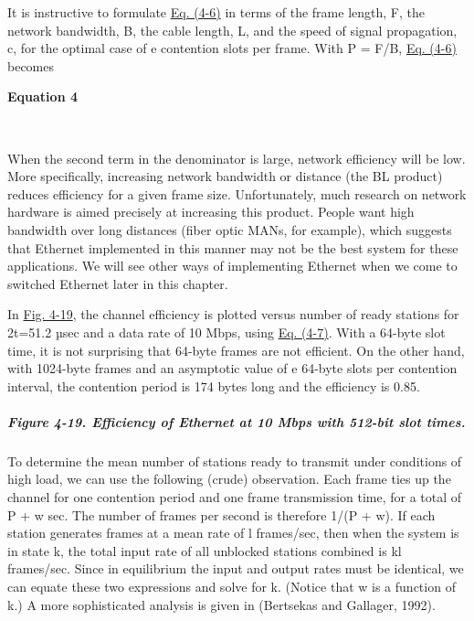 It is instructive to formulate
\protect\hyperlink{0130661023_ch04lev1sec3.htmlux5cux23ch04eq06}{Eq.
(4-6)} in terms of the frame length, {F}, the network bandwidth, {B},
the cable length, {L}, and the speed of signal propagation, {c}, for the
optimal case of {e} contention slots per frame. With {P} = {F/B},
\protect\hyperlink{0130661023_ch04lev1sec3.htmlux5cux23ch04eq06}{Eq.
(4-6)} becomes

\textbf{\protect\hypertarget{0130661023_ch04lev1sec3.htmlux5cux23ch04eq07}{}{}
Equation 4}


~

When the second term in the denominator is large, network efficiency
will be low. More specifically, increasing network bandwidth or distance
(the {BL} product) reduces efficiency for a given frame size.
Unfortunately, much research on network hardware is aimed precisely at
increasing this product. People want high bandwidth over long distances
(fiber optic MANs, for example), which suggests that Ethernet
implemented in this manner may not be the best system for these
applications. We will see other ways of implementing Ethernet when we
come to switched Ethernet later in this chapter.

In
\protect\hyperlink{0130661023_ch04lev1sec3.htmlux5cux23ch04fig19}{Fig.
4-19}, the channel efficiency is plotted versus number of ready stations
for 2{t}=51.2 µsec and a data rate of 10 Mbps, using
\protect\hyperlink{0130661023_ch04lev1sec3.htmlux5cux23ch04eq07}{Eq.
(4-7)}. With a 64-byte slot time, it is not surprising that 64-byte
frames are not efficient. On the other hand, with 1024-byte frames and
an asymptotic value of {e} 64-byte slots per contention interval, the
contention period is 174 bytes long and the efficiency is 0.85.

\subparagraph[Figure 4-19. Efficiency of Ethernet at 10 Mbps with
512-bit slot
times.]{\texorpdfstring{\protect\hypertarget{0130661023_ch04lev1sec3.htmlux5cux23ch04fig19}{}{}Figure
4-19. Efficiency of Ethernet at 10 Mbps with 512-bit slot
times.}{Figure 4-19. Efficiency of Ethernet at 10 Mbps with 512-bit slot times.}}


To determine the mean number of stations ready to transmit under
conditions of high load, we can use the following (crude) observation.
Each frame ties up the channel for one contention period and one frame
transmission time, for a total of {P} + {w} sec. The number of frames
per second is therefore 1{/}({P} + {w}){.} If each station generates
frames at a mean rate of {l} frames/sec, then when the system is in
state {k}, the total input rate of all unblocked stations combined is
{k}{l} frames/sec. Since in equilibrium the input and output rates must
be identical, we can equate these two expressions and solve for {k.}
(Notice that {w} is a function of {k.}) A more sophisticated analysis is
given in (Bertsekas and Gallager, 1992).

